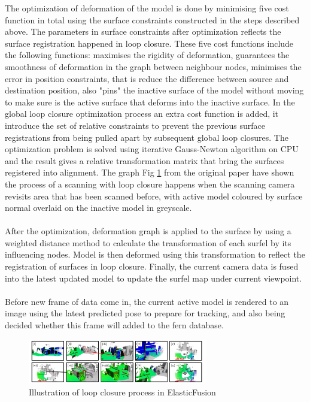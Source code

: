 \documentclass[12pt,twoside]{article}
\begin{document}
The optimization of deformation of the model is done by minimising five cost function in total using the surface constraints constructed in the steps described above. The parameters in surface constraints after optimization reflects the surface registration happened in loop closure. These five cost functions include the following functions: maximises the rigidity of deformation, guarantees the smoothness of deformation in the graph between neighbour nodes, minimises the error in position constraints, that is reduce the difference between source and destination position, also "pins" the inactive surface of the model without moving to make sure is the active surface that deforms into the inactive surface. In the global loop closure optimization process an extra cost function is added, it introduce the set of relative constraints to prevent the previous surface registrations from being pulled apart by subsequent global loop closures. The optimization problem is  solved using iterative Gauss-Newton algorithm on CPU and the result gives a relative transformation matrix that bring the surfaces registered into alignment. The graph Fig \ref{fig:loopclosure} from the original paper have shown the process of a scanning with loop closure happens when the scanning camera revisits area that has been scanned before, with active model coloured by surface normal overlaid on the inactive model in greyscale.\\
\\
After the optimization, deformation graph is applied to the surface by using a weighted distance method to calculate the transformation of each surfel by its influencing nodes. Model is then deformed using this transformation to reflect the registration of surfaces in loop closure. Finally, the current camera data is fused into the latest updated model to update the surfel map under current viewpoint.\\
\\
Before new frame of data come in, the current active model is rendered to an image using the latest predicted pose to prepare for tracking, and also being decided whether this frame will added to the fern database.\\
\begin{figure}[h]
    \centering
    \includegraphics[width=0.7\textwidth]{figures/loopclosure}
    \caption{Illustration of loop closure process in ElasticFusion}
    \label{fig:loopclosure}
\end{figure}
\end{document}

